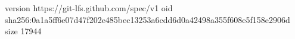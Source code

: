 version https://git-lfs.github.com/spec/v1
oid sha256:0a1a5ff6e07d47f202e485bec13253a6cdd6d0a42498a355f608e5f158e2906d
size 17944
